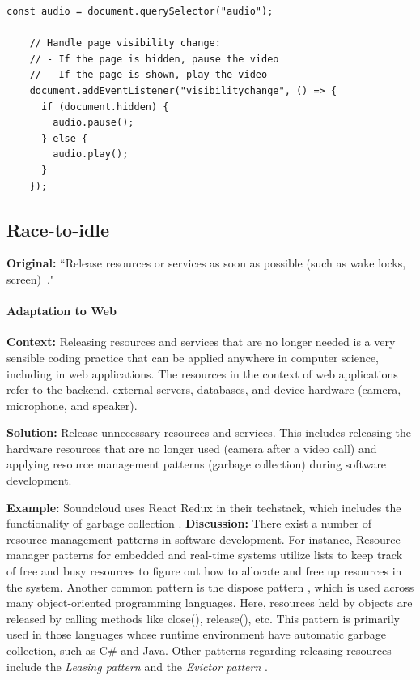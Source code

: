 \begin{minipage}{0.95\linewidth}
    \begin{lstlisting}[caption={Code snippet from Mozilla API that handles page visibility change \cite{MozillaAPI}},
     label={AvoidExtraenousWorkCode}]
    const audio = document.querySelector("audio");
    
    // Handle page visibility change:
    // - If the page is hidden, pause the video
    // - If the page is shown, play the video
    document.addEventListener("visibilitychange", () => {
      if (document.hidden) {
        audio.pause();
      } else {
        audio.play();
      }
    });
    \end{lstlisting}
\end{minipage}


\subsection{Race-to-idle}\label{sec:patterns-RaceToIdle}
\textbf{Original:} ``Release resources or services as soon as possible (such as wake locks, screen)~\cite{cruz2019catalog}."

\paragraph{Adaptation to Web}\mbox{}

\textbf{Context:} Releasing resources and services that are no longer needed is a very sensible coding practice that can be applied anywhere in computer science, including in web applications. The resources in the context of web applications refer to the backend, external servers, databases, and device hardware (\eg camera, microphone, and speaker).

\textbf{Solution:} Release unnecessary resources and services. This includes releasing the hardware resources that are no longer used (\eg camera after a video call) and applying resource management patterns (\eg garbage collection) during software development.

\textbf{Example:} Soundcloud uses React Redux in their techstack, which includes the functionality of garbage collection \cite{Garbagecollect}.
\textbf{Discussion:} There exist a number of resource management patterns in software development. For instance, Resource manager patterns \cite{design_pattern_resource_manager} for embedded and real-time systems utilize lists to keep track of free and busy resources to figure out how to allocate and free up resources in the system. Another common pattern is the dispose pattern \cite{wikipedia_dispose_pattern}, which is used across many object-oriented programming languages. Here, resources held by objects are released by calling methods like close(), release(), etc. This pattern is primarily used in those languages whose runtime environment have automatic garbage collection, such as C\# and Java. Other patterns regarding releasing resources include the \emph{Leasing pattern} and the \emph{Evictor pattern} \cite{resource_manager_patterns}.

